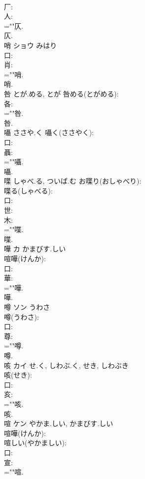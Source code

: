 \documentclass[8pt]{extreport}
\begin{document}
\begin{CJK}{UTF8}{min}
\\	厂: 
\\	人: 
\\	=""仄.
\\	仄.
\\	哨	ショウ	みはり		
\\	口: 
\\	肖: 
\\	=""哨.
\\	哨.
\\	咎		とが.める, とが			咎める(とがめる): 
\\	各: 
\\	=""咎.
\\	咎.
\\	囁		ささや.く			囁く(ささやく): 
\\	口: 
\\	聶: 
\\	=""囁.
\\	囁.
\\	喋		しゃべ.る, ついば.む			お喋り(おしゃべり): 
\\	喋る(しゃべる): 
\\	口: 
\\	世: 
\\	木: 
\\	=""喋.
\\	喋.
\\	嘩	カ	かまびす.しい		
\\	喧嘩(けんか): 
\\	口: 
\\	華: 
\\	=""嘩.
\\	嘩.
\\	噂	ソン	うわさ		
\\	噂(うわさ): 
\\	口: 
\\	尊: 
\\	=""噂.
\\	噂.
\\	咳	カイ	せ.く, しわぶ.く, せき, しわぶき		
\\	咳(せき): 
\\	口: 
\\	亥: 
\\	=""咳.
\\	咳.
\\	喧	ケン	やかま.しい, かまびす.しい		
\\	喧嘩(けんか): 
\\	喧しい(やかましい): 
\\	口: 
\\	宣: 
\\	=""喧.

\end{CJK}
\end{document}
